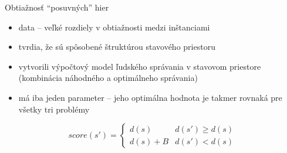 \documentclass[xcolor={table}]{beamer}
\begin{document}
    		\begin{frame}{Obtiažnosť ``posuvných'' hier}
    				\begin{block}{}
    					\begin{itemize}
    						\item data -- veľké rozdiely v obtiažnosti medzi inštanciami
    						\item tvrdia, že sú spôsobené štruktúrou stavového priestoru
    						\item vytvorili výpočtový model ľudského správania v stavovom priestore (kombinácia náhodného a optimálneho správania)
    						\item má iba jeden parameter -- jeho optimálna hodnota je takmer rovnaká pre všetky tri problémy
    					\end{itemize}
    				\end{block}
    				
    				$$score(s')=
\begin{cases}
d(s) & d(s') \geq d(s)\\
d(s) + B & d(s') < d(s)
\end{cases}$$
    		\end{frame}   
\end{document}
